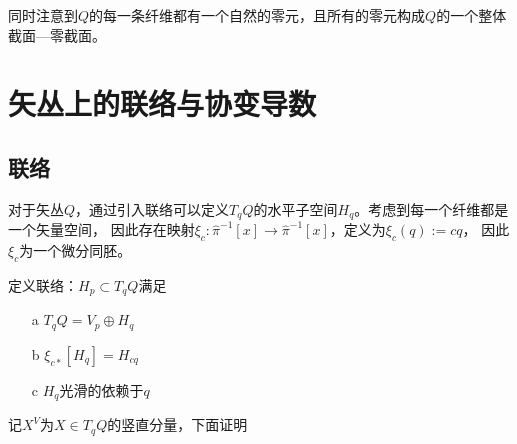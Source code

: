 \documentclass{ctexbook}
\begin{document}
同时注意到$Q$的每一条纤维都有一个自然的零元，且所有的零元构成$Q$的一个整体截面---零截面。



\chapter{矢丛上的联络与协变导数}

\section{联络}

对于矢丛$Q$，通过引入联络可以定义$T_q Q$的水平子空间$H_q$。考虑到每一个纤维都是一个矢量空间， 因此存在映射$\xi_c\colon\hat{\pi}^{-1}[x]\to\hat{\pi}^{-1}[x]$，定义为$\xi_c(q):=c q$， 因此$\xi_c$为一个微分同胚。

定义联络：$H_p\subset T_q Q$满足

\begin{enumerate}
    \item[a] $T_q Q=V_p\oplus H_q$
    \item[b] $\xi_{c*}[H_q]=H_{c q}$
    \item[c] $H_q$光滑的依赖于$q$
\end{enumerate}

记$X^V$为$X\in T_q Q$的竖直分量，下面证明
\end{document}

